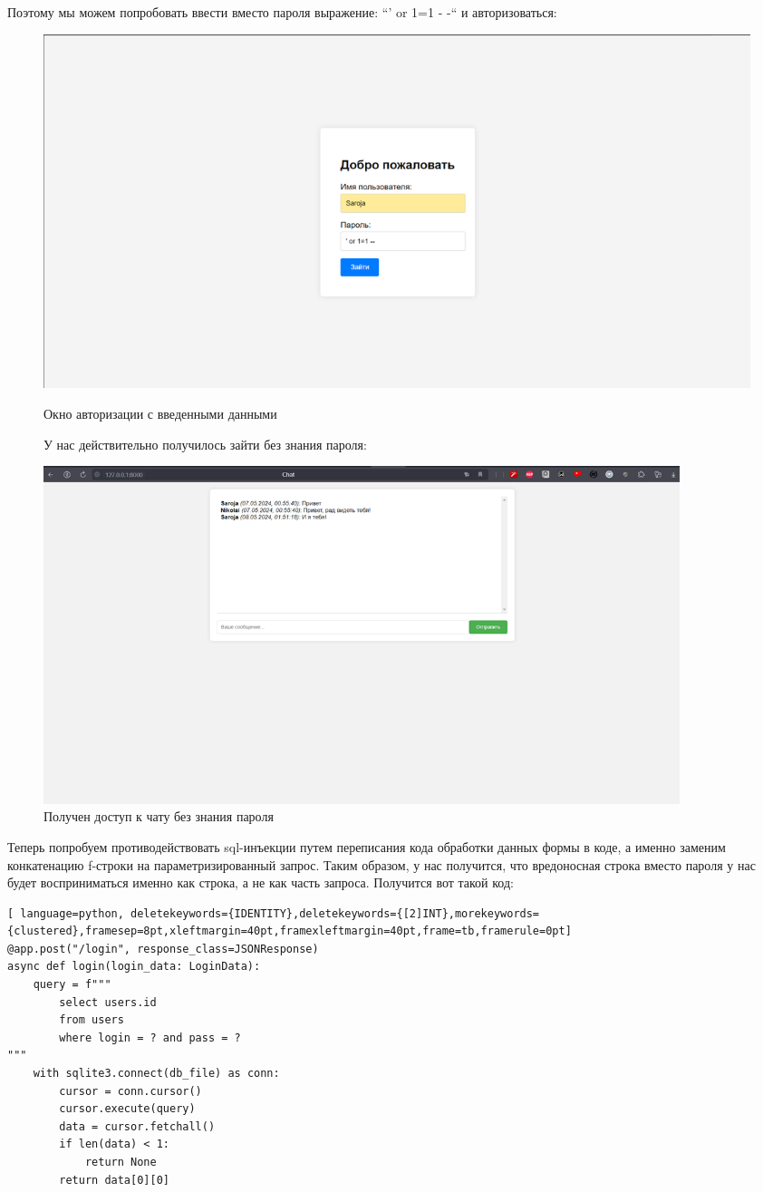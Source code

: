 \documentclass[a4paper,12pt]{diplom}
\begin{document}
	 Поэтому мы можем попробовать ввести вместо пароля выражение: ``' or 1=1 - -`` и авторизоваться:
	 
	 \begin{figure}[!ht]
	 {\centering
	 \includegraphics[width=1\textwidth]{auth_sql_injection_attack.png}
	 \caption{Окно авторизации с введенными данными}\par\medskip
	 \label{fig:auth_sql_injection_attack} 
	 }
	 У нас действительно получилось зайти без знания пароля:\par\bigskip
	 {\centering
	 \includegraphics[width=0.9\textwidth]{chat_sql_injection_attack_success.png}
	 \caption{Получен доступ к чату без знания пароля}
	 \label{fig:chat_sql_injection_attack_success}
	 }
	 \end{figure}
	 \pagebreak
	 Теперь попробуем противодействовать sql-инъекции путем переписания кода обработки данных формы в коде, а именно заменим конкатенацию f-строки на параметризированный запрос. Таким образом, у нас получится, что вредоносная строка вместо пароля у нас будет восприниматься именно как строка, а не как часть запроса. Получится вот такой код:
	 
	 \begin{lstlisting}[ language=python, deletekeywords={IDENTITY},deletekeywords={[2]INT},morekeywords={clustered},framesep=8pt,xleftmargin=40pt,framexleftmargin=40pt,frame=tb,framerule=0pt]    
@app.post("/login", response_class=JSONResponse)
async def login(login_data: LoginData):
	query = f"""
	 	select users.id
	 	from users
	 	where login = ? and pass = ?
"""
	with sqlite3.connect(db_file) as conn:
		cursor = conn.cursor()
	 	cursor.execute(query)
	 	data = cursor.fetchall()
	 	if len(data) < 1:
	 		return None
	 	return data[0][0]
	 \end{lstlisting}
	 
\end{document}
